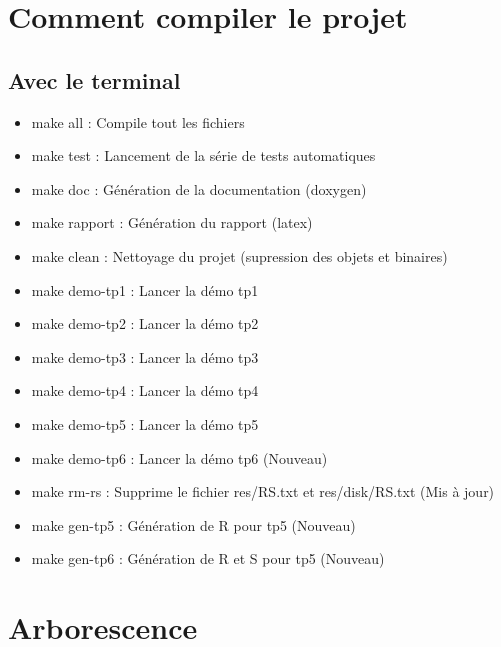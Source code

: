 \documentclass[a4paper]{article}
\begin{document}
\section{Comment compiler le projet}

\subsection{Avec le terminal}

\begin{itemize}
	\item make all : Compile tout les fichiers
	\item make test : Lancement de la série de tests automatiques
	\item make doc  : Génération de la documentation (doxygen)
	\item make rapport : Génération du rapport (latex)
	\item make clean : Nettoyage du projet (supression des objets et binaires)
	\item make demo-tp1 : Lancer la démo tp1
	\item make demo-tp2 : Lancer la démo tp2
	\item make demo-tp3 : Lancer la démo tp3
	\item make demo-tp4 : Lancer la démo tp4
	\item make demo-tp5 : Lancer la démo tp5
  \item make demo-tp6 : Lancer la démo tp6 (Nouveau)
	\item make rm-rs : Supprime le fichier res/RS.txt et res/disk/RS.txt (Mis à jour)
  \item make gen-tp5 : Génération de R pour tp5 (Nouveau)
  \item make gen-tp6 : Génération de R et S pour tp5 (Nouveau)
\end{itemize}

\section{Arborescence}
\end{document}
